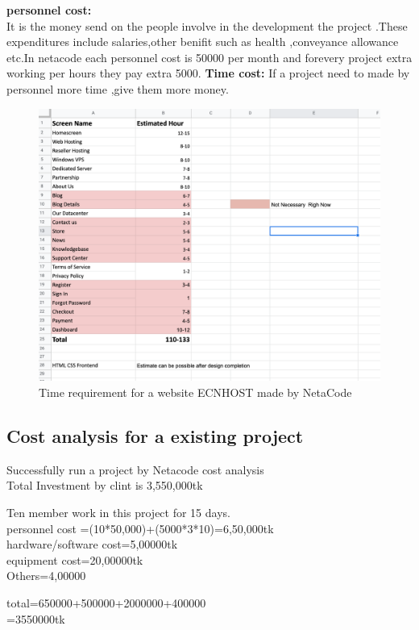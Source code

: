 \documentclass[a4paper,12pt]{report}
\begin{document}
\subitem \textbf{personnel cost:\\}It is the money send on the people involve in the development the project .These expenditures include salaries,other benifit such as health ,conveyance allowance etc.In netacode
each personnel cost is 50000 per month and forevery project extra working per hours they pay extra 5000.
\subitem \textbf{Time cost:} 
If a project need to made by personnel more time ,give them more money.
\newpage
\begin{figure}[h]
	\centering
	\includegraphics[width=1\linewidth]{8_1}
	\caption{Time requirement for a website ECNHOST made by NetaCode }
	\label{fig:81}
\end{figure}
\subsection{Cost analysis for a existing project}
Successfully run a project by Netacode cost analysis\\
Total Investment by clint is 3,550,000tk
\begin{center}
	Ten member work in this project for 15 days.\\
	personnel cost =(10*50,000)+(5000*3*10)=6,50,000tk\\
	hardware/software cost=5,00000tk\\
	equipment cost=20,00000tk\\
	Others=4,00000\\
\end{center}
\begin{center}
	total=650000+500000+2000000+400000\\
	=3550000tk\\
\end{center}
\end{document}
